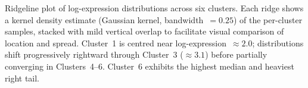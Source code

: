 \caption{Ridgeline plot of log-expression distributions across six clusters. Each ridge shows a kernel density estimate (Gaussian kernel, bandwidth~$= 0.25$) of the per-cluster samples, stacked with mild vertical overlap to facilitate visual comparison of location and spread. Cluster~1 is centred near log-expression~$\approx 2.0$; distributions shift progressively rightward through Cluster~3 ($\approx 3.1$) before partially converging in Clusters~4--6. Cluster~6 exhibits the highest median and heaviest right tail.}
